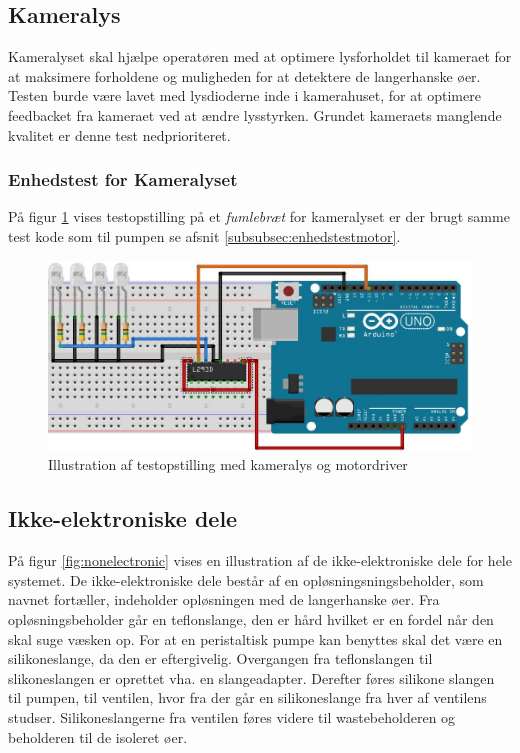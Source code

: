 \newpage
 \subsection{Kameralys}
 \label{subsec:kameralys}
Kameralyset skal hjælpe operatøren med at optimere lysforholdet til kameraet for at maksimere forholdene og muligheden for at detektere de langerhanske øer. Testen burde være lavet med lysdioderne inde i kamerahuset, for at optimere feedbacket fra kameraet ved at ændre lysstyrken. Grundet kameraets manglende kvalitet er denne test nedprioriteret.

\subsubsection{Enhedstest for Kameralyset}
På figur \ref{fig:LEDbreadboard} vises testopstilling på et \textit{fumlebræt} for kameralyset er der brugt samme test kode som til pumpen se afsnit \ref{subsubsec:enhedstestmotor}. 

\begin{figure}[H]
	\centering
	\includegraphics[width=1\textwidth]{billeder/Hardware/diagrammer/LEDbreadboard.JPG}
	\caption{Illustration af testopstilling med kameralys og motordriver}
	\label{fig:LEDbreadboard}
\end{figure}

 
\newpage 
\subsection{Ikke-elektroniske dele}
På figur \ref{fig:nonelectronic} vises en illustration af de ikke-elektroniske dele for hele systemet. De ikke-elektroniske dele består af en opløsningsningsbeholder, som navnet fortæller, indeholder opløsningen med de langerhanske øer. Fra opløsningsbeholder går en teflonslange, den er hård hvilket er en fordel når den skal suge væsken op. For at en peristaltisk pumpe kan benyttes skal det være en silikoneslange, da den er eftergivelig. Overgangen fra teflonslangen til slikoneslangen er oprettet vha. en slangeadapter. Derefter føres silikone slangen til pumpen, til ventilen, hvor fra der går en silikoneslange fra hver af ventilens studser. Silikoneslangerne fra ventilen føres videre til wastebeholderen og beholderen til de isoleret øer.

